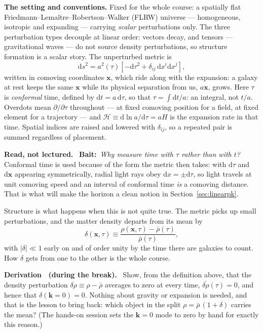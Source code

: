 \documentclass[a4paper,11pt]{article}
\newcommand{\vx}{\bm{x}}
\newcommand{\vk}{\bm{k}}
\def\cH{\mathcal{H}}
\newcommand{\dd}{\mathrm{d}}
\numberwithin{equation}{section}
\newenvironment{reading}
  {\par\medskip\noindent\begingroup\small\color{black!58}%
   \textbf{Read, not lectured.}\ }
  {\endgroup\par\medskip}
\newcommand{\bait}[1]{\textbf{Bait:}\ \emph{#1}\ }
\newcounter{derivation}
\newenvironment{derivation}
  {\par\medskip\noindent\begingroup\small\refstepcounter{derivation}%
   \color{Plum!60!black}\textbf{Derivation \thederivation\ (during the break).}\ }
  {\endgroup\par\medskip}
\begin{document}
\medskip
\noindent\textbf{The setting and conventions.} Fixed for the whole course: a
spatially flat Friedmann--Lema\^itre--Robertson--Walker (FLRW) universe ---
homogeneous, isotropic and expanding --- carrying \emph{scalar} perturbations
only. The three perturbation types decouple at linear order: vectors decay, and
tensors --- gravitational waves --- do not source density perturbations, so
structure formation is a scalar story. The unperturbed metric is
\begin{equation*}
\dd s^2 = a^2(\tau)\left[-\dd\tau^2 + \delta_{ij}\,\dd x^i\dd x^j\right],
\end{equation*}
written in comoving coordinates $\vx$, which ride along with the expansion: a
galaxy at rest keeps the same $\vx$ while its physical separation from us,
$a\vx$, grows. Here $\tau$ is \emph{conformal} time, defined by
$\dd t = a\,\dd\tau$, so that $\tau = \int\dd t/a$: an integral, not $t/a$.
Overdots mean $\partial/\partial\tau$ throughout --- at fixed comoving position
for a field, at fixed element for a trajectory --- and
$\cH \equiv \dd\ln a/\dd\tau = aH$ is the expansion rate in that time. Spatial
indices are raised and lowered with $\delta_{ij}$, so a repeated pair is summed
regardless of placement.
\begin{reading}
\bait{Why measure time with $\tau$ rather than with $t$?}
Conformal time is used because of the form the metric then takes: with $\dd\tau$
and $\dd\vx$ appearing symmetrically, radial light rays obey
$\dd x = \pm\dd\tau$, so light travels at unit comoving speed and an interval of
conformal time \emph{is} a comoving distance. That is what will make the horizon
a clean notion in Section~\ref{sec:linearpk}.
\end{reading}

Structure is what happens when this is not quite true. The metric
picks up small perturbations, and the matter density departs from its mean by
\begin{equation*}
\delta(\vx,\tau) \equiv \frac{\rho(\vx,\tau) - \bar\rho(\tau)}{\bar\rho(\tau)} ,
\end{equation*}
with $|\delta|\ll1$ early on and of order unity by the time there are galaxies to
count. How $\delta$ gets from one to the other is the whole course.

\begin{derivation}
Show, from the definition above, that the density perturbation
$\delta\rho \equiv \rho - \bar\rho$ averages to zero at every time,
$\overline{\delta\rho}(\tau) = 0$, and hence that $\delta(\vk{=}0) = 0$.
Nothing about gravity or expansion is needed, and that is the lesson to bring
back: which object in the split $\rho = \bar\rho\,(1+\delta)$ carries the mean?
(The hands-on session sets the $\vk = 0$ mode to zero by hand for exactly this
reason.)
\end{derivation}
\end{document}
